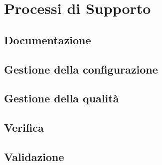 \section{Processi di Supporto}
\subsection{Documentazione}
\subsection{Gestione della configurazione}
\subsection{Gestione della qualità}
\subsection{Verifica}
\subsection{Validazione}